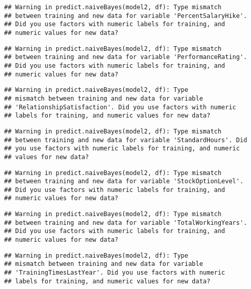 \documentclass[
]{article}
\begin{document}
\begin{verbatim}
## Warning in predict.naiveBayes(model2, df): Type mismatch
## between training and new data for variable 'PercentSalaryHike'.
## Did you use factors with numeric labels for training, and
## numeric values for new data?
\end{verbatim}

\begin{verbatim}
## Warning in predict.naiveBayes(model2, df): Type mismatch
## between training and new data for variable 'PerformanceRating'.
## Did you use factors with numeric labels for training, and
## numeric values for new data?
\end{verbatim}

\begin{verbatim}
## Warning in predict.naiveBayes(model2, df): Type
## mismatch between training and new data for variable
## 'RelationshipSatisfaction'. Did you use factors with numeric
## labels for training, and numeric values for new data?
\end{verbatim}

\begin{verbatim}
## Warning in predict.naiveBayes(model2, df): Type mismatch
## between training and new data for variable 'StandardHours'. Did
## you use factors with numeric labels for training, and numeric
## values for new data?
\end{verbatim}

\begin{verbatim}
## Warning in predict.naiveBayes(model2, df): Type mismatch
## between training and new data for variable 'StockOptionLevel'.
## Did you use factors with numeric labels for training, and
## numeric values for new data?
\end{verbatim}

\begin{verbatim}
## Warning in predict.naiveBayes(model2, df): Type mismatch
## between training and new data for variable 'TotalWorkingYears'.
## Did you use factors with numeric labels for training, and
## numeric values for new data?
\end{verbatim}

\begin{verbatim}
## Warning in predict.naiveBayes(model2, df): Type
## mismatch between training and new data for variable
## 'TrainingTimesLastYear'. Did you use factors with numeric
## labels for training, and numeric values for new data?
\end{verbatim}
\end{document}

